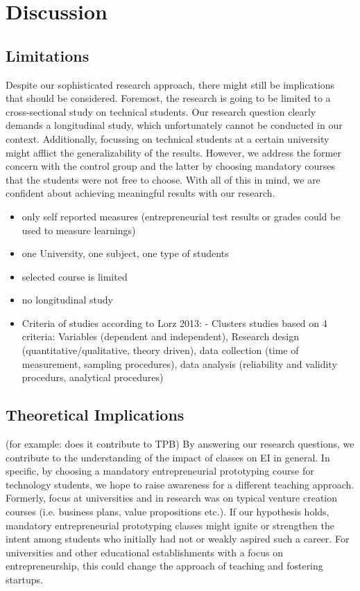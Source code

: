 \chapter{Discussion}\label{chapter:discussion}

\section{Limitations}
Despite our sophisticated research approach, there might still be implications that should be considered. Foremost, the research is going to be limited to a cross-sectional study on technical students. Our research question clearly demands a longitudinal study, which unfortunately cannot be conducted in our context. Additionally, focussing on technical students at a certain university might afflict the generalizability of the results. However, we address the former concern with the control group and the latter by choosing mandatory courses that the students were not free to choose. With all of this in mind, we are confident about achieving meaningful results with our research.

\begin{itemize}
\item only self reported measures (entrepreneurial test results or grades could be used to measure learnings)
\item one University, one subject, one type of students
\item selected course is limited
\item no longitudinal study
\item Criteria of studies according to Lorz 2013: -	Clusters studies based on 4 criteria: Variables (dependent and independent), Research design (quantitative/qualitative, theory driven), data collection (time of measurement, sampling procedures), data analysis (reliability and validity procedurs, analytical procedures)
\end{itemize}

\section{Theoretical Implications}
(for example: does it contribute to TPB)
By answering our research questions, we contribute to the understanding of the impact of classes on EI in general. In specific, by choosing a mandatory entrepreneurial prototyping course for technology students, we hope to raise awareness for a different teaching approach. Formerly, focus at universities and in research was on typical venture creation courses (i.e. business plans, value propositions etc.). If our hypothesis holds, mandatory entrepreneurial prototyping classes might ignite or strengthen the intent among students who initially had not or weakly aspired such a career. For universities and other educational establishments with a focus on entrepreneurship, this could change the approach of teaching and fostering startups.

